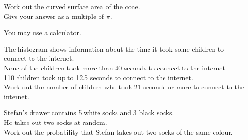 \documentclass{exam}
\begin{document}
\begin{questions}
    Work out the curved surface area of the cone.\\
    Give your answer as a multiple of $\pi$.
    \newpage

    \question You may use a calculator.
    \begin{center}
    \end{center}
    The histogram shows information about the time it took some children to connect to the internet.\\
    None of the children took more than 40 seconds to connect to the internet.\\

    110 children took up to 12.5 seconds to connect to the internet.\\
    Work out the number of children who took 21 seconds or more to connect to the internet.
    \newpage

    \question Stefan's drawer contains 5 white socks and 3 black socks.\\
    He takes out two socks at random.\\

    Work out the probability that Stefan takes out two socks of the same colour.
\end{questions}
\end{document}
